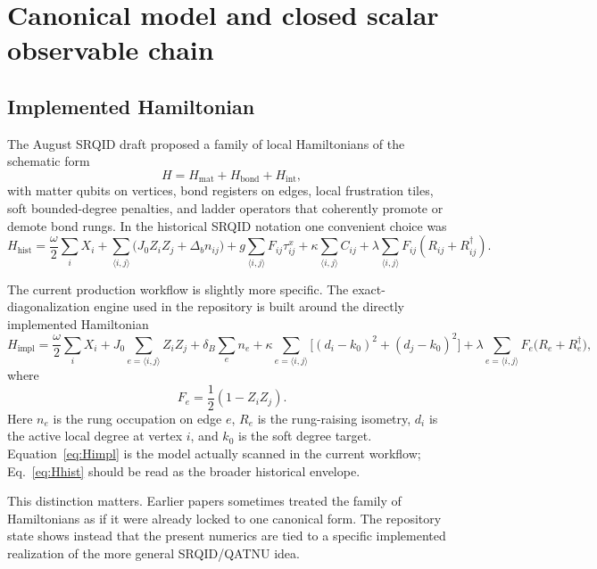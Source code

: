 \documentclass[11pt]{article}
\begin{document}
\section{Canonical model and closed scalar observable chain}

\subsection{Implemented Hamiltonian}

The August SRQID draft proposed a family of local Hamiltonians of the schematic form
\[
H = H_{\mathrm{mat}} + H_{\mathrm{bond}} + H_{\mathrm{int}},
\]
with matter qubits on vertices, bond registers on edges, local frustration tiles, soft bounded-degree penalties, and ladder operators that coherently promote or demote bond rungs. In the historical SRQID notation one convenient choice was
\begin{equation}
H_{\mathrm{hist}}
=
\frac{\omega}{2}\sum_i X_i
+
\sum_{\langle i,j\rangle}\bigl(J_0 Z_i Z_j + \Delta_b n_{ij}\bigr)
+
g\sum_{\langle i,j\rangle}F_{ij}\tau^x_{ij}
+
\kappa\sum_{\langle i,j\rangle}C_{ij}
+
\lambda\sum_{\langle i,j\rangle}F_{ij}(R_{ij}+R^\dagger_{ij}).
\label{eq:Hhist}
\end{equation}

The current production workflow is slightly more specific. The exact-diagonalization engine used in the repository is built around the directly implemented Hamiltonian
\begin{equation}
H_{\mathrm{impl}}
=
\frac{\omega}{2}\sum_i X_i
+
J_0 \sum_{e=\langle i,j\rangle} Z_i Z_j
+
\delta_B \sum_e n_e
+
\kappa \sum_{e=\langle i,j\rangle}\Big[(d_i-k_0)^2 + (d_j-k_0)^2\Big]
+
\lambda \sum_{e=\langle i,j\rangle} F_e \bigl(R_e + R_e^\dagger\bigr),
\label{eq:Himpl}
\end{equation}
where
\[
F_e = \frac{1}{2}(1-Z_i Z_j).
\]
Here $n_e$ is the rung occupation on edge $e$, $R_e$ is the rung-raising isometry, $d_i$ is the active local degree at vertex $i$, and $k_0$ is the soft degree target. Equation~\eqref{eq:Himpl} is the model actually scanned in the current workflow; Eq.~\eqref{eq:Hhist} should be read as the broader historical envelope.

This distinction matters. Earlier papers sometimes treated the family of Hamiltonians as if it were already locked to one canonical form. The repository state shows instead that the present numerics are tied to a specific implemented realization of the more general SRQID/QATNU idea.
\end{document}
